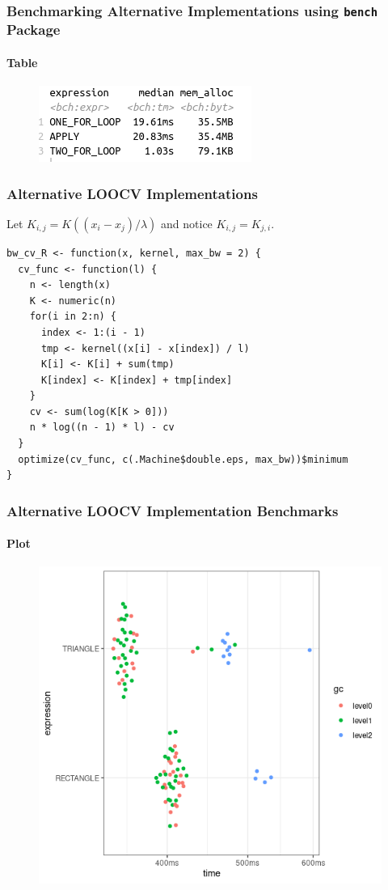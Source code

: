 \documentclass[aspectratio=169]{beamer}
\begin{document}
\begin{frame}
  \frametitle{Benchmarking Alternative Implementations using \texttt{bench} Package}
  \framesubtitle{Table}
  \begin{figure}
    \centering
    \includegraphics[scale = 0.7]{figure/R_FOR_APPLY_dens.png}
  \end{figure}
\end{frame}
\begin{frame}[fragile]
  \frametitle{Alternative LOOCV Implementations}
  Let $K_{i,j}=K((x_{i}-x_{j}) / \lambda)$ and notice $K_{i,j}=K_{j,i}$.\\
\begin{verbatim}
bw_cv_R <- function(x, kernel, max_bw = 2) {
  cv_func <- function(l) {
    n <- length(x)
    K <- numeric(n)
    for(i in 2:n) {
      index <- 1:(i - 1)
      tmp <- kernel((x[i] - x[index]) / l)
      K[i] <- K[i] + sum(tmp)
      K[index] <- K[index] + tmp[index]
    }
    cv <- sum(log(K[K > 0]))
    n * log((n - 1) * l) - cv
  }
  optimize(cv_func, c(.Machine$double.eps, max_bw))$minimum
}
\end{verbatim}
\end{frame}
\begin{frame}
  \frametitle{Alternative LOOCV Implementation Benchmarks}
  \framesubtitle{Plot}
  \begin{figure}
    \centering
    \includegraphics[scale = 0.5]{figure/RecVsTri.png}
  \end{figure}
\end{frame}
\end{document}
